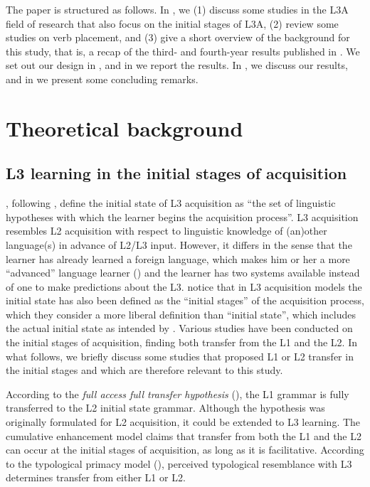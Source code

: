 \documentclass[output=paper]{langsci/langscibook}
\begin{document}
The paper is structured as follows. In , we (1) discuss some studies in the L3A field of research that also focus on the initial stages of L3A, (2) review some studies on verb placement, and (3) give a short overview of the background for this study, that is, a recap of the third- and fourth-year results published in \citet{StadtEtAl2016, StadtEtAl2018Exposure}. We set out our design in , and in  we report the results. In , we discuss our results, and in  we present some concluding remarks.

\section{Theoretical background}%
\label{sec:stadt:2}
\subsection{ L3 learning in the initial stages of acquisition}%
\label{sec:stadt:2.1}

 \citet[15]{GarciaMayoRothman2012}, following \citet{SchwartzSprouse1996}, define the initial state of L3 acquisition as “the set of linguistic hypotheses with which the learner begins the acquisition process”. L3 acquisition resembles L2 acquisition with respect to linguistic knowledge of (an)other language(s) in advance of L2/L3 input. However, it differs in the sense that the learner has already learned a foreign language, which makes him or her a more ``advanced'' language learner (\citealt{CenozValencia1994, Jessner2006}) and the learner has two systems available instead of one to make predictions about the L3. \citet[fn. 12]{GarciaMayoRothman2012} notice that in L3 acquisition models the initial state has also been defined as the ``initial stages'' of the acquisition process, which they consider a more liberal definition than ``initial state'', which includes the actual initial state as intended by \citet{SchwartzSprouse1996}. Various studies have been conducted on the initial stages of acquisition, finding both transfer from the L1 and the L2. In what follows, we briefly discuss some studies that proposed L1 or L2 transfer in the initial stages and which are therefore relevant to this study.

According to the \textit{full access full transfer hypothesis} (\citealt{SchwartzSprouse1996}), the L1 grammar is fully transferred to the L2 initial state grammar. Although the hypothesis was originally formulated for L2 acquisition, it could be extended to L3 learning. The cumulative enhancement model \citep{FlynnEtAl2004} claims that transfer from both the L1 and the L2 can occur at the initial stages of acquisition, as long as it is facilitative. According to the typological primacy model (\citealt{Rothman2010, Rothman2011, Rothman2015}), perceived typological resemblance with L3 determines transfer from either L1 or L2.
\end{document}
